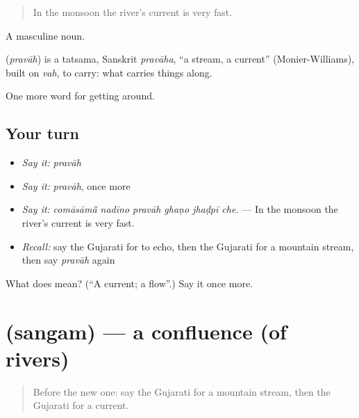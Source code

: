 \begin{quote}
In the monsoon the river's current is very fast.
\end{quote}

A masculine noun.

\begin{cousinweb}
\textbf{} (\emph{pravāh}) is a tatsama, Sanskrit \emph{pravāha}, \textquotedblleft{}a stream, a current\textquotedblright{} (Monier-Williams), built on \emph{vah}, to carry: what carries things along.
\end{cousinweb}

\begin{grammarlens}[title={What you've built}]
One more word for getting around.
\end{grammarlens}

\subsection*{Your turn}
\begin{itemize}
\raggedright
  \item \emph{Say it:} \emph{pravāh}
  \item \emph{Say it:} \emph{pravāh}, once more
  \item \emph{Say it:} \emph{comāsāmā̃ nadīno pravāh ghaṇo jhaḍpī che.} — In the monsoon the river's current is very fast.
  \item \emph{Recall:} say the Gujarati for to echo, then the Gujarati for a mountain stream, then say \emph{pravāh} again
\end{itemize}

\begin{tcolorbox}[breakable,colback=teal!4,colframe=teal!35!black,title={Before you move on}]
What does  mean? (\textquotedblleft{}A current; a flow\textquotedblright{}.) Say it once more.
\end{tcolorbox}
\section[\texorpdfstring{\gu{સંગમ} (sangam)}{સંગમ (sangam)}]{ (sangam) — a confluence (of rivers)}

\label{lesson:GU-C440-sangam}



\begin{quote}
Before the new one: say the Gujarati for a mountain stream, then the Gujarati for a current.
\end{quote}

